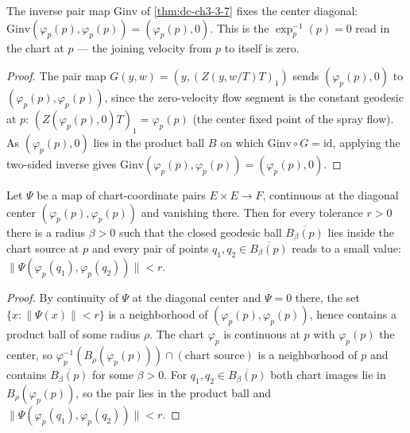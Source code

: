 \begin{lemma}
  \label{lem:dc-ch3-4-2-invdiagonal}
  \leanok
  The inverse pair map $\mathrm{Ginv}$ of \cref{thm:dc-ch3-3-7} fixes the center
  diagonal: $\mathrm{Ginv}(\varphi_p(p),\varphi_p(p))=(\varphi_p(p),0)$. This is
  the $\exp_p^{-1}(p)=0$ read in the chart at $p$ — the joining velocity
  from $p$ to itself is zero.
\end{lemma}
\begin{proof}
  \sketch
  \leanok
  The pair map $G(y,w)=(y,(Z(y,w/T)T)_1)$ sends $(\varphi_p(p),0)$ to
  $(\varphi_p(p),\varphi_p(p))$, since the zero-velocity flow segment is the
  constant geodesic at $p$: $(Z(\varphi_p(p),0)T)_1=\varphi_p(p)$ (the center
  fixed point of the spray flow). As $(\varphi_p(p),0)$ lies in the product ball
  $B$ on which $\mathrm{Ginv}\circ G=\mathrm{id}$, applying the two-sided inverse
  gives $\mathrm{Ginv}(\varphi_p(p),\varphi_p(p))=(\varphi_p(p),0)$.
\end{proof}

\begin{lemma}
  \label{lem:dc-ch3-4-2-pairsmall}
  \leanok
  Let $\Psi$ be a map of chart-coordinate pairs $E\times E\to F$, continuous at the
  diagonal center $(\varphi_p(p),\varphi_p(p))$ and vanishing there. Then for every
  tolerance $r>0$ there is a radius $\beta>0$ such that the closed geodesic ball
  $\overline{B_\beta(p)}$ lies inside the chart source at $p$ and every pair of
  points $q_1,q_2\in\overline{B_\beta(p)}$ reads to a small value:
  $\|\Psi(\varphi_p(q_1),\varphi_p(q_2))\|<r$.
\end{lemma}
\begin{proof}
  \sketch
  \leanok
  By continuity of $\Psi$ at the diagonal center and $\Psi=0$ there, the set
  $\{x:\|\Psi(x)\|<r\}$ is a neighborhood of $(\varphi_p(p),\varphi_p(p))$, hence
  contains a product ball of some radius $\rho$. The chart $\varphi_p$ is
  continuous at $p$ with $\varphi_p(p)$ the center, so
  $\varphi_p^{-1}(B_\rho(\varphi_p(p)))\cap(\text{chart source})$ is a neighborhood
  of $p$ and contains $\overline{B_\beta(p)}$ for some $\beta>0$. For
  $q_1,q_2\in\overline{B_\beta(p)}$ both chart images lie in $B_\rho(\varphi_p(p))$,
  so the pair lies in the product ball and $\|\Psi(\varphi_p(q_1),\varphi_p(q_2))\|<r$.

\end{proof}

